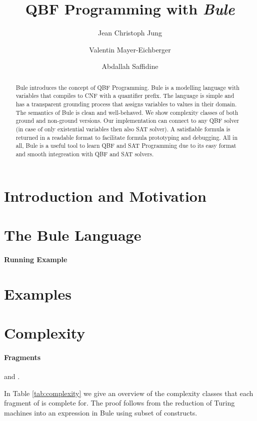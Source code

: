 \documentclass[runningheads]{llncs}
\title{ QBF Programming with \emph{Bule}}
\author{Jean Christoph Jung\inst{1} \and Valentin Mayer-Eichberger\inst{2} \and
Abdallah Saffidine\inst{3}}
\institute{Universit\"at Bremen, Germany \and Technische Universit\"at Berlin, Germany \and University of New South Wales, Sydney, Australia }
\begin{document}
\maketitle

\begin{abstract}
    Bule introduces the concept of QBF Programming. 
    Bule is a modelling language with variables that compiles to CNF with a quantifier prefix.
    The language is simple and has a transparent grounding process that assigns variables to values in their domain. 
    The semantics of Bule is clean and well-behaved. 
    We show complexity classes of both ground and non-ground versions. 
    Our implementation can connect to any QBF solver (in case of only existential variables then also SAT solver). 
    A satisfiable formula is returned in a readable format to facilitate formula prototyping and debugging. 
    All in all, Bule is a useful tool to learn QBF and SAT Programming due to its easy format and smooth integreation with QBF and SAT solvers. 
\end{abstract}

\section{Introduction and Motivation}

\section{The Bule Language}

\paragraph{Running Example}

\section{Examples}

\section{Complexity}

\paragraph{Fragments}
 and . 

In Table \ref{tab:complexity} we give an overview of the complexity classes
that each fragment of is complete for. The proof follows from the reduction of
Turing machines into an expression in Bule using subset of constructs.
\end{document}
